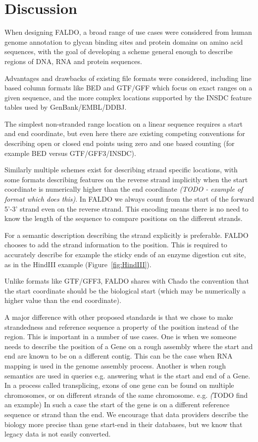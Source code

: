 \section*{Discussion}
When designing FALDO, a broad range of use cases were considered from
human genome annotation to glycan binding sites and protein domains on
amino acid sequences, with the goal of developing a scheme general enough
to describe regions of DNA, RNA and protein sequences.

Advantages and drawbacks of existing file formats were considered, including
line based column formats like BED and GTF/GFF which focus on exact
ranges on a given sequence, and the more complex locations supported
by the INSDC feature tables used by GenBank/EMBL/DDBJ.

The simplest non-stranded range location on a linear sequence requires
a start and end coordinate, but even here there are existing competing
conventions for describing open or closed end points using zero and
one based counting (for example BED versus GTF/GFF3/INSDC).

Similarly multiple schemes exist for describing strand specific locations,
with some formats describing features on the reverse strand implicitly
when the start coordinate is numerically higher than the end coordinate
\textit{(TODO - example of format which does this)}.
In FALDO we always count from the start of the forward 5'-3' strand even on the reverse strand.
This encoding means there is no need to know the length of the sequence to compare positions on the different strands.

For a semantic description describing the strand explicitly is preferable.
FALDO chooses to add the strand information to the position. 
This is required to accurately describe for example the sticky ends
of an enzyme digestion cut site, as in the HindIII example (Figure~\ref{fig:HindIII}).

Unlike formats like GTF/GFF3, FALDO shares with Chado\cite{Chado2007} the convention
that the start coordinate should be the biological start (which 
may be numerically a higher value than the end coordinate).

A major difference with other proposed standards is that we chose to make strandedness and reference sequence a property of the position instead of the region.
This is important in a number of use cases.
One is when we someone needs to describe the position of a Gene on a rough assembly where the start and end are known to be on a different contig. 
This can be the case when RNA mapping is used in the genome assembly process.
Another is when rough semantics are used in queries e.g. answering what is the start and end of a Gene. 
In a process called transplicing, exons of one gene can be found on multiple chromosomes, or on different strands of the same chromosome. e.g. \textit(TODO find an example)
In such a case the start of the gene is on a different reference sequence or strand than the end.
We encourage that data providers describe the biology more precise than gene start-end in their databases, but we know that legacy data is not easily converted.


